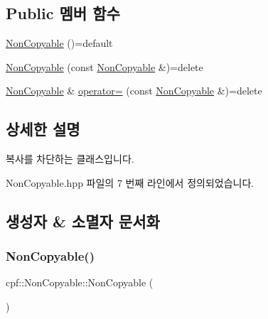 \subsection*{Public 멤버 함수}
\begin{DoxyCompactItemize}
\item 
\hyperlink{classcpf_1_1_non_copyable_abd233cd8f5e778f7a7ba258e7729092f}{Non\+Copyable} ()=default
\item 
\hyperlink{classcpf_1_1_non_copyable_a5aa73b9cfec65049b3dea0ea2a8ea528}{Non\+Copyable} (const \hyperlink{classcpf_1_1_non_copyable}{Non\+Copyable} \&)=delete
\item 
\hyperlink{classcpf_1_1_non_copyable}{Non\+Copyable} \& \hyperlink{classcpf_1_1_non_copyable_a2d6fb4d45055443aad6051676509af70}{operator=} (const \hyperlink{classcpf_1_1_non_copyable}{Non\+Copyable} \&)=delete
\end{DoxyCompactItemize}


\subsection{상세한 설명}
복사를 차단하는 클래스입니다. 

Non\+Copyable.\+hpp 파일의 7 번째 라인에서 정의되었습니다.



\subsection{생성자 \& 소멸자 문서화}
\mbox{\label{classcpf_1_1_non_copyable_abd233cd8f5e778f7a7ba258e7729092f}} 
\subsubsection{\texorpdfstring{Non\+Copyable()}{NonCopyable()}\hspace{0.1cm}{\footnotesize\ttfamily [1/2]}}
{\footnotesize\ttfamily cpf\+::\+Non\+Copyable\+::\+Non\+Copyable (\begin{DoxyParamCaption}{ }\end{DoxyParamCaption})\hspace{0.3cm}{\ttfamily [default]}}

\mbox{\label{classcpf_1_1_non_copyable_a5aa73b9cfec65049b3dea0ea2a8ea528}} 
